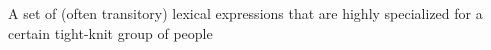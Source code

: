 A set of (often transitory) lexical expressions that are highly specialized for a certain tight-knit group of people
